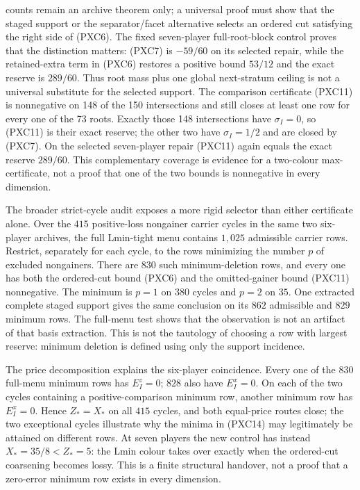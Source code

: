 \documentclass[11pt]{article}
\begin{document}
counts remain an archive theorem only; a universal proof must show that the
staged support or the separator/facet alternative selects an ordered cut
satisfying the right side of (PXC6).  The fixed seven-player full-root-block
control proves that the distinction matters: (PXC7) is $-59/60$ on its
selected repair, while the retained-extra term in (PXC6) restores a positive
bound $53/12$ and the exact reserve is $289/60$.  Thus root mass plus one
global next-stratum ceiling is not a universal substitute for the selected
support.
The comparison certificate (PXC11) is nonnegative on 148 of the 150
intersections and still closes at least one row for every one of the 73
roots.  Exactly those 148 intersections have $\sigma_I=0$, so (PXC11) is
their exact reserve; the other two have $\sigma_I=1/2$ and are closed by
(PXC7).  On the selected seven-player repair (PXC11) again equals the exact
reserve $289/60$.  This complementary
coverage is evidence for a two-colour max-certificate, not a proof that one
of the two bounds is nonnegative in every dimension.

The broader strict-cycle audit exposes a more rigid selector than either
certificate alone.  Over the $415$ positive-loss nongainer carrier cycles in
the same two six-player archives, the full Lmin-tight menu contains $1{,}025$
admissible carrier rows.  Restrict, separately for each cycle, to the rows
minimizing the number $p$ of excluded nongainers.  There are $830$ such
minimum-deletion rows, and every one has both the ordered-cut bound (PXC6) and
the omitted-gainer bound (PXC11) nonnegative.  The minimum is $p=1$ on $380$
cycles and $p=2$ on $35$.  One extracted complete staged support gives the
same conclusion on its $862$ admissible and $829$ minimum rows.  The full-menu
test shows that the observation is not an artifact of that basis extraction.
This is not the tautology of
choosing a row with largest reserve: minimum deletion is defined using only
the support incidence.

The price decomposition explains the six-player coincidence.  Every one of
the $830$ full-menu minimum rows has $E_I^z=0$; $828$ also have $E_I^x=0$.
On each of the two cycles containing a positive-comparison minimum row,
another minimum row has $E_I^x=0$.  Hence $Z_*=X_*$ on all $415$ cycles, and
both equal-price routes close; the two exceptional cycles illustrate why the
minima in (PXC14) may legitimately be attained on different rows.  At seven
players the new control has instead
$X_*=35/8<Z_*=5$: the Lmin colour takes over exactly when the ordered-cut
coarsening becomes lossy.  This is a finite structural handover, not a proof
that a zero-error minimum row exists in every dimension.
\end{document}

